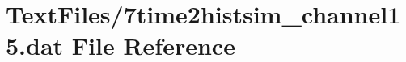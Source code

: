 \hypertarget{7time2histsim__channel15_8dat}{}\section{Text\+Files/7time2histsim\+\_\+channel15.dat File Reference}
\label{7time2histsim__channel15_8dat}

